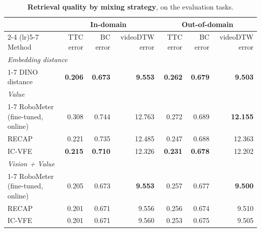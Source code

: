 \begin{table}[t]
    \centering
    \caption{\textbf{Retrieval quality by mixing strategy}, on the \NumEvalTasks{} evaluation tasks.}
    \label{tab:retrieval-quality}
    \footnotesize
    \begin{tabular}{lrrrrrr}
        \toprule
        & \multicolumn{3}{c}{In-domain} & \multicolumn{3}{c}{Out-of-domain} \\
        \cmidrule(lr){2-4} \cmidrule(lr){5-7}
        Method & TTC error & BC error & videoDTW error & TTC error & BC error & videoDTW error \\
        \midrule
        \multicolumn{7}{l}{\textit{Embedding distance}} \\
        \cmidrule(lr){1-7}
        DINO distance & \textbf{0.206} & \textbf{0.673} & \textbf{9.553} & \textbf{0.262} & \textbf{0.679} & \textbf{9.503} \\
        \multicolumn{7}{l}{\textit{Value}} \\
        \cmidrule(lr){1-7}
        RoboMeter (fine-tuned, online)         & 0.308 & 0.744 & 12.763 & 0.272 & 0.689 & \textbf{12.155} \\
        RECAP                                  & 0.221 & 0.735 & 12.485 & 0.247 & 0.688 & 12.363 \\
        IC-VFE                                 & \textbf{0.215} & \textbf{0.710} & 12.326 & \textbf{0.231} & \textbf{0.678} & 12.202 \\
        \multicolumn{7}{l}{\textit{Vision + Value}} \\
        \cmidrule(lr){1-7}
        RoboMeter (fine-tuned, online)         & 0.205 & 0.673 & \textbf{9.553} & 0.257 & 0.677 & \textbf{9.500} \\
        RECAP                                  & 0.201 & 0.671 & 9.556 & 0.256 & 0.674 & 9.510 \\
        IC-VFE                                 & 0.201 & 0.671 & 9.560 & 0.253 & 0.675 & 9.505 \\
        \bottomrule
    \end{tabular}
\end{table}